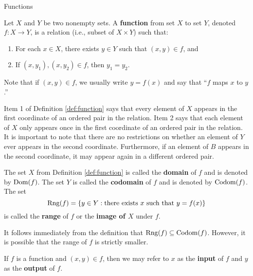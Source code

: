 \begin{section}{Functions}

\begin{definition}
Let $X$ and $Y$ be two nonempty sets.  A \textbf{function} from set $X$ to set $Y$, denoted $f:X\to Y$, is a relation (i.e., subset of $X\times Y$) such that:

\begin{enumerate}\label{def:function}
\item For each $x\in X$, there exists $y\in Y$ such that $(x,y)\in f$, and
\item If $(x,y_{1}), (x,y_{2}) \in f$, then $y_{1}=y_{2}$.
\end{enumerate}
Note that if $(x,y)\in f$, we usually write $y=f(x)$ and say that ``$f$ maps $x$ to $y$.''
\end{definition}

\begin{remark}
Item 1 of Definition \ref{def:function} says that every element of $X$ appears in the first coordinate of an ordered pair in the relation.  Item 2 says that each element of $X$ only appears once in the first coordinate of an ordered pair in the relation.  It is important to note that there are no restrictions on whether an element of $Y$ ever appears in the second coordinate.  Furthermore, if an element of $B$ appears in the second coordinate, it may appear again in a different ordered pair.
\end{remark}

\begin{definition}
The set $X$ from Definition \ref{def:function} is called the \textbf{domain} of $f$ and is denoted by $\operatorname{Dom}(f)$.  The set $Y$ is called the \textbf{codomain} of $f$ and is denoted by $\operatorname{Codom}(f)$.  The set
\[
\operatorname{Rng}(f)=\{y\in Y: \mbox{there exists }x\mbox{ such that } y=f(x)\}
\]
is called the \textbf{range} of $f$ or the \textbf{image of $X$} under $f$.
\end{definition}

\begin{remark}
It follows immediately from the definition that $\operatorname{Rng}(f)\subseteq \operatorname{Codom}(f)$.  However, it is possible that the range of $f$ is strictly smaller.
\end{remark}

\begin{remark}
If $f$ is a function and $(x,y)\in f$, then we may refer to $x$ as the \textbf{input} of $f$ and $y$ as the \textbf{output} of $f$.
\end{remark}


\end{section}
